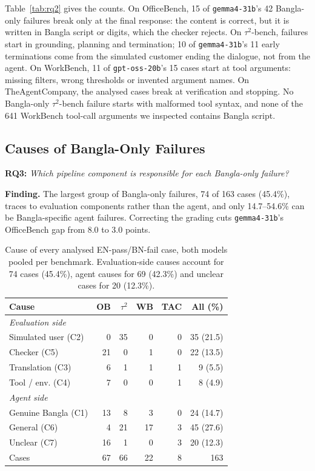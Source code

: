 \documentclass[11pt]{article}
\newcommand{\gemma}{\texttt{gemma4-31b}}
\newcommand{\gptoss}{\texttt{gpt-oss-20b}}
\newcommand{\OB}{OfficeBench}
\newcommand{\WB}{WorkBench}
\newcommand{\TAU}{$\tau^2$-bench}
\newcommand{\TAC}{TheAgentCompany}
\begin{document}
Table~\ref{tab:rq2} gives the counts. On \OB{}, 15 of
\gemma{}'s 42 Bangla-only failures break only at the final response: the content is correct, but
it is written in Bangla script or digits, which the checker rejects. On \TAU{}, failures start
in grounding, planning and termination; 10 of \gemma{}'s 11 early terminations come from the
simulated customer ending the dialogue, not from the agent. On \WB{}, 11 of \gptoss{}'s 15
cases start at tool arguments: missing filters, wrong thresholds or invented argument names.
On \TAC{}, the analysed cases break at verification and stopping. No Bangla-only \TAU{} failure
starts with malformed tool syntax, and none of the 641 \WB{} tool-call arguments we inspected
contains Bangla script.

\subsection{Causes of Bangla-Only Failures}
\label{sec:rq3}

\noindent\textbf{RQ3:} \emph{Which pipeline component is responsible for each Bangla-only failure?}

\noindent\textbf{Finding.} The largest group of Bangla-only failures, 74 of 163 cases (45.4\%),
traces to evaluation components rather than the agent, and only 14.7--54.6\% can be
Bangla-specific agent failures. Correcting the grading cuts \gemma{}'s \OB{} gap from 8.0 to 3.0
points.

\begin{table}[t]
\centering\footnotesize
\setlength{\tabcolsep}{3pt}
\begin{tabular}{lrrrrr}
\toprule
Cause & OB & $\tau^2$ & WB & TAC & All (\%) \\
\midrule
\multicolumn{6}{l}{\emph{Evaluation side}} \\
Simulated user (C2) & 0 & 35 & 0 & 0 & 35 (21.5) \\
Checker (C5)        & 21 & 0 & 1 & 0 & 22 (13.5) \\
Translation (C3)    & 6 & 1 & 1 & 1 & 9 (5.5) \\
Tool / env. (C4)    & 7 & 0 & 0 & 1 & 8 (4.9) \\
\multicolumn{6}{l}{\emph{Agent side}} \\
Genuine Bangla (C1) & 13 & 8 & 3 & 0 & 24 (14.7) \\
General (C6)        & 4 & 21 & 17 & 3 & 45 (27.6) \\
Unclear (C7)        & 16 & 1 & 0 & 3 & 20 (12.3) \\
\midrule
Cases               & 67 & 66 & 22 & 8 & 163 \\
\bottomrule
\end{tabular}
\caption{Cause of every analysed EN-pass/BN-fail case, both models pooled per benchmark.
Evaluation-side causes account for 74 cases (45.4\%), agent causes for 69 (42.3\%) and unclear
cases for 20 (12.3\%).}
\label{tab:attribution}
\end{table}
\end{document}
